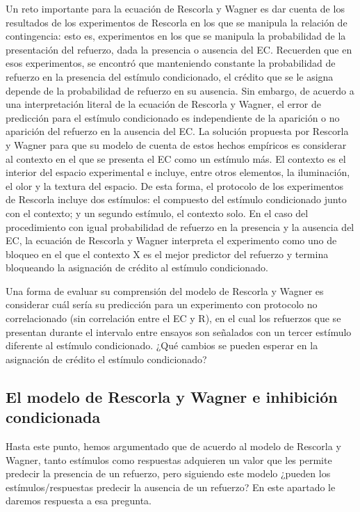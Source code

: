 \documentclass[
  a4paper,
  DIV=11,
  numbers=noendperiod]{scrreprt}
\begin{document}
Un reto importante para la ecuación de Rescorla y Wagner es dar cuenta
de los resultados de los experimentos de Rescorla en los que se manipula
la relación de contingencia: esto es, experimentos en los que se
manipula la probabilidad de la presentación del refuerzo, dada la
presencia o ausencia del EC. Recuerden que en esos experimentos, se
encontró que manteniendo constante la probabilidad de refuerzo en la
presencia del estímulo condicionado, el crédito que se le asigna depende
de la probabilidad de refuerzo en su ausencia. Sin embargo, de acuerdo a
una interpretación literal de la ecuación de Rescorla y Wagner, el error
de predicción para el estímulo condicionado es independiente de la
aparición o no aparición del refuerzo en la ausencia del EC. La solución
propuesta por Rescorla y Wagner para que su modelo de cuenta de estos
hechos empíricos es considerar al contexto en el que se presenta el EC
como un estímulo más. El contexto es el interior del espacio
experimental e incluye, entre otros elementos, la iluminación, el olor y
la textura del espacio. De esta forma, el protocolo de los experimentos
de Rescorla incluye dos estímulos: el compuesto del estímulo
condicionado junto con el contexto; y un segundo estímulo, el contexto
solo. En el caso del procedimiento con igual probabilidad de refuerzo en
la presencia y la ausencia del EC, la ecuación de Rescorla y Wagner
interpreta el experimento como uno de bloqueo en el que el contexto X es
el mejor predictor del refuerzo y termina bloqueando la asignación de
crédito al estímulo condicionado.

Una forma de evaluar su comprensión del modelo de Rescorla y Wagner es
considerar cuál sería su predicción para un experimento con protocolo no
correlacionado (sin correlación entre el EC y R), en el cual los
refuerzos que se presentan durante el intervalo entre ensayos son
señalados con un tercer estímulo diferente al estímulo condicionado.
¿Qué cambios se pueden esperar en la asignación de crédito el estímulo
condicionado?

\subsection{El modelo de Rescorla y Wagner e inhibición
condicionada}\label{el-modelo-de-rescorla-y-wagner-e-inhibiciuxf3n-condicionada}

Hasta este punto, hemos argumentado que de acuerdo al modelo de Rescorla
y Wagner, tanto estímulos como respuestas adquieren un valor que les
permite predecir la presencia de un refuerzo, pero siguiendo este modelo
¿pueden los estímulos/respuestas predecir la ausencia de un refuerzo? En
este apartado le daremos respuesta a esa pregunta.
\end{document}
